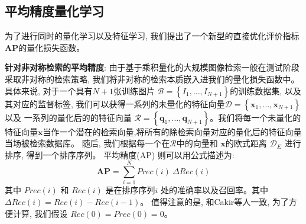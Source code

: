 \subsection{平均精度量化学习}
为了进行同时的量化学习以及特征学习, 我们提出了一个新型的直接优化评价指标\textbf{AP}的量化损失函数。 \par
\textbf{针对非对称检索的平均精度}: 由于基于乘积量化的大规模图像检索一般在测试阶段采取非对称的检索策略, 我们将非对称的检索本质嵌入进我们的量化损失函数中。具体来说, 对于一个具有$N+1$张训练图片 $\mathcal{B}=\left\{I_{1}, \ldots, I_{N+1}\right\}$的训练数据集, 以及其对应的监督标签, 我们可以获得一系列的未量化的特征向量$\mathcal{D} = \left\{ \mathbf{x}_{1}, \ldots, \mathbf{x}_{N+1} \right\}$以及
一系列的量化后的的特征向量 $\mathcal{R} = \left\{ \mathbf{q}_1, \ldots, \mathbf{q}_{N+1} \right \}$。我们将每一个未量化的特征向量$\mathbf{x}$当作一个潜在的检索向量,将所有的除检索向量对应的量化后的特征向量当场被检索数据库。 随后, 我们根据每一个在$\mathcal{R}$中的向量和 $\mathbf{x}$的欧式距离
$\mathcal{D}_E$ 进行排序, 得到一个排序序列。 平均精度(AP) 则可以用公式描述为:
\begin{equation}
    \mathbf{AP}=\sum_{i=1}^{N} Prec(i) \ \Delta Rec(i)
    \end{equation}
其中 $Prec(i)$ 和 $Rec(i)$ 是在排序序列$i$ 处的准确率以及召回率。其中$\Delta Rec(i) = Rec(i) - Rec(i-1)$。 值得注意的是,  和Cakir等人一致, 为了方便计算, 我们假设 $Rec(0) = Prec(0) =  0$。

